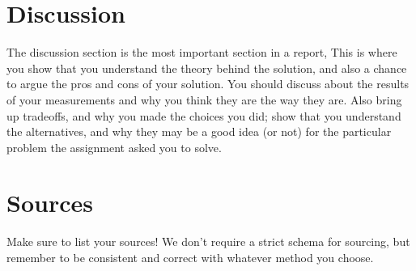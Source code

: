 \documentclass{article}
\begin{document}
\begin{flushleft}
\section[Discussion]{Discussion}
The discussion section is the most important section in a report, This is where you show that you understand the theory behind the solution, and also a chance to argue the pros and cons of your solution. You should discuss about the results of your measurements and why you think they are the way they are. Also bring up tradeoffs, and why you made the choices you did; show that you understand the alternatives, and why they may be a good idea (or not) for the particular problem the assignment asked you to solve.

\section{Sources}
Make sure to list your sources! We don't require a strict schema for sourcing, but remember to be consistent and correct with whatever method you choose.


\bigskip
\end{flushleft}
\end{document}
